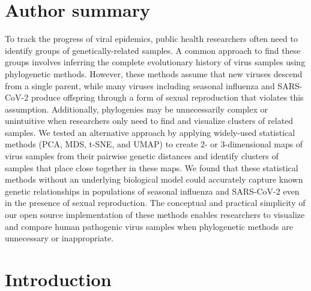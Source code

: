 \documentclass[10pt,letterpaper]{article}
\begin{document}
\section*{Author summary}
To track the progress of viral epidemics, public health researchers often need to identify groups of genetically-related samples.
A common approach to find these groups involves inferring the complete evolutionary history of virus samples using phylogenetic methods.
However, these methods assume that new viruses descend from a single parent, while many viruses including seasonal influenza and SARS-CoV-2 produce offspring through a form of sexual reproduction that violates this assumption.
Additionally, phylogenies may be unnecessarily complex or unintuitive when researchers only need to find and visualize clusters of related samples.
We tested an alternative approach by applying widely-used statistical methods (PCA, MDS, t-SNE, and UMAP) to create 2- or 3-dimensional maps of virus samples from their pairwise genetic distances and identify clusters of samples that place close together in these maps.
We found that these statistical methods without an underlying biological model could accurately capture known genetic relationships in populations of seasonal influenza and SARS-CoV-2 even in the presence of sexual reproduction.
The conceptual and practical simplicity of our open source implementation of these methods enables researchers to visualize and compare human pathogenic virus samples when phylogenetic methods are unnecessary or inappropriate.

\linenumbers

\section*{Introduction}
\end{document}
